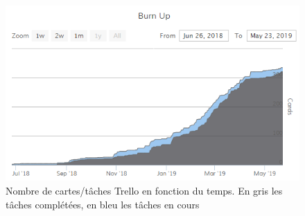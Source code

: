 \documentclass{EPL-master-thesis-covers-FR}
\begin{document}
			\begin{figure}[H]
					\includegraphics[width=\textwidth]{images/trello_stat}
					\caption{Nombre de cartes/tâches Trello en fonction du temps. En gris les tâches complétées, en bleu les tâches en cours}
					\label{fig:trello_stat}
			\end{figure}

	{}
	


	\appendix


		
		\label{sec:cdc}
		


		
		
\end{document}
